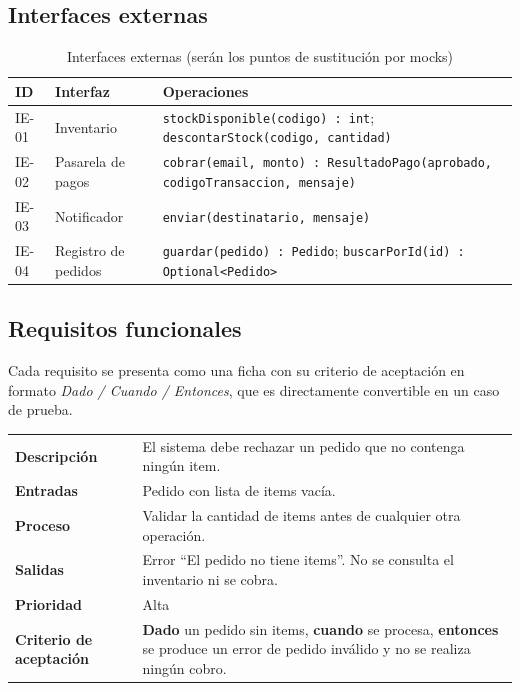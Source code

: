 \documentclass[11pt,a4paper,oneside]{report}
\newcommand{\code}[1]{\texttt{#1}}
\begin{document}
\subsection{Interfaces externas}
\begin{table}[H]
\centering
\caption{Interfaces externas (serán los puntos de sustitución por mocks)}
\small
\begin{tabularx}{\linewidth}{llX}
\toprule
\textbf{ID} & \textbf{Interfaz} & \textbf{Operaciones}\\
\midrule
IE-01 & Inventario & \code{stockDisponible(codigo) : int}; \code{descontarStock(codigo, cantidad)}\\
IE-02 & Pasarela de pagos & \code{cobrar(email, monto) : ResultadoPago(aprobado, codigoTransaccion, mensaje)}\\
IE-03 & Notificador & \code{enviar(destinatario, mensaje)}\\
IE-04 & Registro de pedidos & \code{guardar(pedido) : Pedido}; \code{buscarPorId(id) : Optional<Pedido>}\\
\bottomrule
\end{tabularx}
\end{table}

\subsection{Requisitos funcionales}
Cada requisito se presenta como una ficha con su criterio de aceptación en formato \emph{Dado / Cuando / Entonces}, que es directamente convertible en un caso de prueba.

\newcommand{\fichareq}[8]{%
\begin{tcolorbox}[colback=white,colframe=verde,fonttitle=\bfseries,title={#1 -- #2},arc=2pt,boxrule=0.6pt,left=4pt,right=4pt,top=2pt,bottom=2pt,breakable]
\small
\begin{tabularx}{\linewidth}{@{}>{\bfseries}p{2.6cm}X@{}}
Descripción & #3\\
Entradas & #4\\
Proceso & #5\\
Salidas & #6\\
Prioridad & #7\\
Criterio de aceptación & #8\\
\end{tabularx}
\end{tcolorbox}}

\fichareq{RF-01}{Rechazar pedidos sin productos}
{El sistema debe rechazar un pedido que no contenga ningún item.}
{Pedido con lista de items vacía.}
{Validar la cantidad de items antes de cualquier otra operación.}
{Error ``El pedido no tiene items''. No se consulta el inventario ni se cobra.}
{Alta}
{\textbf{Dado} un pedido sin items, \textbf{cuando} se procesa, \textbf{entonces} se produce un error de pedido inválido y no se realiza ningún cobro.}
\end{document}
